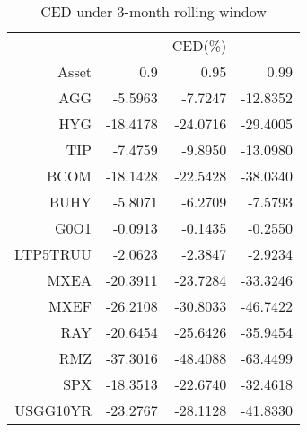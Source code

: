 \documentclass[12pt]{article}
\begin{document}
\begin{table}[!h]
\caption{CED under 3-month rolling window} %
\centering 
\begin{tabular}{ | r || r r r | } 
 \hline
 & & CED(\%) & \\
Asset& 0.9 & 0.95 & 0.99  \\
  \hline \hline
AGG &  -5.5963 &  -7.7247 & -12.8352\\ 
HYG & -18.4178 & -24.0716 & -29.4005\\ 
TIP &  -7.4759 &  -9.8950 & -13.0980\\ 
BCOM & -18.1428 & -22.5428 & -38.0340\\ 
BUHY &  -5.8071 &  -6.2709 &  -7.5793\\ 
G0O1 &  -0.0913 &  -0.1435 &  -0.2550\\ 
LTP5TRUU &  -2.0623 &  -2.3847 &  -2.9234\\ 
MXEA & -20.3911 & -23.7284 & -33.3246\\ 
MXEF & -26.2108 & -30.8033 & -46.7422\\ 
RAY & -20.6454 & -25.6426 & -35.9454\\ 
RMZ & -37.3016 & -48.4088 & -63.4499\\ 
SPX & -18.3513 & -22.6740 & -32.4618\\ 
USGG10YR & -23.2767 & -28.1128 & -41.8330\\
 \hline
\end{tabular}
\label{table:CED3}
\end{table}


% 
% 
\end{document}
